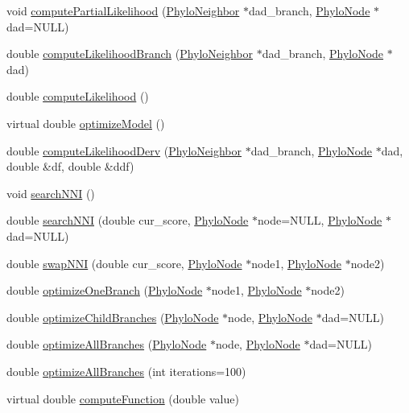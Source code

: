 \begin{DoxyCompactItemize}
void \hyperlink{classPhyloTree_a1c65fd0bcc5b433e6dd4781432aaaccd}{computePartialLikelihood} (\hyperlink{classPhyloNeighbor}{PhyloNeighbor} $\ast$dad\_\-branch, \hyperlink{classPhyloNode}{PhyloNode} $\ast$dad=NULL)
\item 
double \hyperlink{classPhyloTree_a375b6b1fe6d56698b804af890a629869}{computeLikelihoodBranch} (\hyperlink{classPhyloNeighbor}{PhyloNeighbor} $\ast$dad\_\-branch, \hyperlink{classPhyloNode}{PhyloNode} $\ast$dad)
\item 
double \hyperlink{classPhyloTree_a7d6a388ffa393ccf810e8e04718725ec}{computeLikelihood} ()
\item 
virtual double \hyperlink{classPhyloTree_a1e1bf7936bb8a7dbacd92f93dad6d531}{optimizeModel} ()
\item 
double \hyperlink{classPhyloTree_a1c21d2ba4fc8755b3435b5677938a0fb}{computeLikelihoodDerv} (\hyperlink{classPhyloNeighbor}{PhyloNeighbor} $\ast$dad\_\-branch, \hyperlink{classPhyloNode}{PhyloNode} $\ast$dad, double \&df, double \&ddf)
\item 
void \hyperlink{classPhyloTree_a9537038984ab81f946a6025d5607637e}{searchNNI} ()
\item 
double \hyperlink{classPhyloTree_a87ed271cb0d09ad3069a20d996c343f9}{searchNNI} (double cur\_\-score, \hyperlink{classPhyloNode}{PhyloNode} $\ast$node=NULL, \hyperlink{classPhyloNode}{PhyloNode} $\ast$dad=NULL)
\item 
double \hyperlink{classPhyloTree_ad5019f595c9fe481d3eb326bcf10fb03}{swapNNI} (double cur\_\-score, \hyperlink{classPhyloNode}{PhyloNode} $\ast$node1, \hyperlink{classPhyloNode}{PhyloNode} $\ast$node2)
\item 
double \hyperlink{classPhyloTree_a93e28f41404baeca2afcb62f4499a3e1}{optimizeOneBranch} (\hyperlink{classPhyloNode}{PhyloNode} $\ast$node1, \hyperlink{classPhyloNode}{PhyloNode} $\ast$node2)
\item 
double \hyperlink{classPhyloTree_aaad81a0e6fc24cfb5b665655059bc17b}{optimizeChildBranches} (\hyperlink{classPhyloNode}{PhyloNode} $\ast$node, \hyperlink{classPhyloNode}{PhyloNode} $\ast$dad=NULL)
\item 
double \hyperlink{classPhyloTree_ab256efc9eb59170ba486c9b6d6d684c7}{optimizeAllBranches} (\hyperlink{classPhyloNode}{PhyloNode} $\ast$node, \hyperlink{classPhyloNode}{PhyloNode} $\ast$dad=NULL)
\item 
double \hyperlink{classPhyloTree_a0d95172300892b57830027c134d7e181}{optimizeAllBranches} (int iterations=100)
\item 
virtual double \hyperlink{classPhyloTree_a34c7bdc00d48d66e1a8ebfee9af1f100}{computeFunction} (double value)

\end{DoxyCompactItemize}
